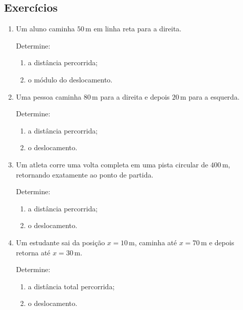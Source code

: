 \documentclass[a4paper,12pt]{article}
\begin{document}
\subsection*{Exercícios}

\begin{enumerate}

\item Um aluno caminha $50\,\text{m}$ em linha reta para a direita.

Determine:

\begin{enumerate}
    \item a distância percorrida;
    \item o módulo do deslocamento.
\end{enumerate}

\vspace{1.5cm}


\item Uma pessoa caminha $80\,\text{m}$ para a direita e depois
$20\,\text{m}$ para a esquerda.

Determine:

\begin{enumerate}
    \item a distância percorrida;
    \item o deslocamento.
\end{enumerate}

\vspace{1.5cm}


\item Um atleta corre uma volta completa em uma pista circular
de $400\,\text{m}$, retornando exatamente ao ponto de partida.

Determine:

\begin{enumerate}
    \item a distância percorrida;
    \item o deslocamento.
\end{enumerate}

\vspace{1.5cm}


\item Um estudante sai da posição $x=10\,\text{m}$, caminha até
$x=70\,\text{m}$ e depois retorna até $x=30\,\text{m}$.

Determine:

\begin{enumerate}
    \item a distância total percorrida;
    \item o deslocamento.
\end{enumerate}


\end{enumerate}
\end{document}
